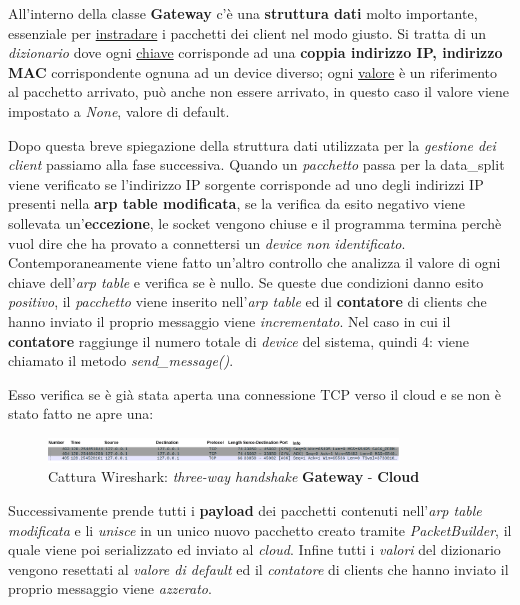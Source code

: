 \documentclass[a4paper,12pt]{report}
\begin{document}
All'interno della classe \textbf{Gateway} c'è una \textbf{struttura dati} molto importante, essenziale per \underline{instradare} i pacchetti dei client nel modo giusto.
%
Si tratta di un \emph{dizionario} dove ogni \underline{chiave} corrisponde ad una \textbf{coppia indirizzo IP, indirizzo MAC} corrispondente ognuna ad un device diverso; ogni \underline{valore} è un riferimento al pacchetto arrivato, può anche non essere arrivato, in questo caso il valore viene impostato a \emph{None}, valore di default.

Dopo questa breve spiegazione della struttura dati utilizzata per la \emph{gestione dei client} passiamo alla fase successiva.
%
Quando un \emph{pacchetto} passa per la data\_split viene verificato se l'indirizzo IP sorgente corrisponde ad uno degli indirizzi IP presenti nella \textbf{arp table modificata}, se la verifica da esito negativo viene sollevata un'\textbf{eccezione}, le socket vengono chiuse e il programma termina perchè vuol dire che ha provato a connettersi un \emph{device non identificato}.
%
Contemporaneamente viene fatto un'altro controllo che analizza il valore di ogni chiave dell'\emph{arp table} e verifica se è nullo.
%
Se queste due condizioni danno esito \emph{positivo}, il \emph{pacchetto} viene inserito nell'\emph{arp table} ed il \textbf{contatore} di clients che hanno inviato il proprio messaggio viene \emph{incrementato}.
%
Nel caso in cui il \textbf{contatore} raggiunge il numero totale di \emph{device} del sistema, quindi 4: viene chiamato il metodo \emph{send\_message()}.

Esso verifica se è già stata aperta una connessione TCP verso il cloud e se non è stato fatto ne apre una:
\begin{figure}[H]
    \centering
    \includegraphics[width=\textwidth,height=25]{img/syncro_TCP.png}
    \caption{Cattura Wireshark: \emph{three-way handshake} \textbf{Gateway} - \textbf{Cloud}}
    \label{fig:syncrotcp}
\end{figure}
Successivamente prende tutti i \textbf{payload} dei pacchetti contenuti nell'\emph{arp table modificata} e li \emph{unisce} in un unico nuovo pacchetto creato tramite \emph{PacketBuilder}, il quale viene poi serializzato ed inviato al \emph{cloud}.
%
Infine tutti i \emph{valori} del dizionario vengono resettati al \emph{valore di default} ed il \emph{contatore} di clients che hanno inviato il proprio messaggio viene \emph{azzerato}.
\end{document}
